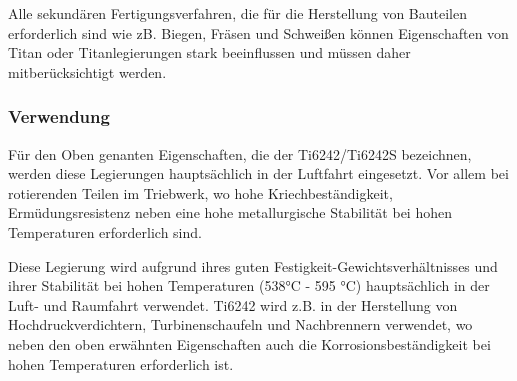 
Alle sekundären Fertigungsverfahren, die für die Herstellung von Bauteilen erforderlich sind   wie zB. Biegen, Fräsen und Schweißen können Eigenschaften von Titan oder Titanlegierungen stark beeinflussen  und müssen daher mitberücksichtigt werden.




\subsubsection{Verwendung}
Für den Oben genanten Eigenschaften, die der Ti6242/Ti6242S bezeichnen, werden diese Legierungen hauptsächlich in der Luftfahrt eingesetzt. Vor allem bei rotierenden Teilen im Triebwerk, wo  hohe Kriechbeständigkeit, Ermüdungsresistenz  neben eine hohe metallurgische Stabilität bei hohen Temperaturen erforderlich sind. 





Diese Legierung wird aufgrund ihres guten Festigkeit-Gewichtsverhältnisses und ihrer  Stabilität bei hohen Temperaturen (538°C - 595 °C) hauptsächlich in der Luft- und Raumfahrt  verwendet.\newline
Ti6242 wird z.B. in der Herstellung von Hochdruckverdichtern, Turbinenschaufeln und Nachbrennern verwendet, wo neben den oben erwähnten Eigenschaften auch die Korrosionsbeständigkeit bei hohen Temperaturen erforderlich ist. \newline



